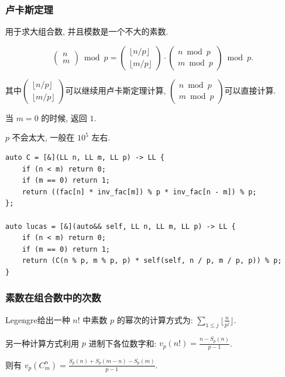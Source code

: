 \documentclass[UTF8, a4paper, titlepage, twoside]{ctexart}
\begin{document}
\subsubsection{ 卢卡斯定理 }
用于求大组合数, 并且模数是一个不大的素数.

$$
\left(\begin{array}{cl}n \\ m\end{array}\right) \bmod p = \left(\begin{array}{cl}{\lfloor n / p\rfloor} \\ {\lfloor m / p\rfloor}\end{array}\right) \cdot\left(\begin{array}{cl}n \bmod p \\ m \bmod p\end{array}\right) \bmod p.
$$

其中$\left(\begin{array}{cl}{\lfloor n / p\rfloor} \\ {\lfloor m / p\rfloor}\end{array}\right)$可以继续用卢卡斯定理计算, $\left(\begin{array}{cl}n \bmod p \\ m \bmod p\end{array}\right)$可以直接计算.

当 $m = 0$ 的时候, 返回 $1$. 

$p$ 不会太大, 一般在 $10^5$ 左右.

\begin{lstlisting}
auto C = [&](LL n, LL m, LL p) -> LL {
    if (n < m) return 0;
    if (m == 0) return 1;
    return ((fac[n] * inv_fac[m]) % p * inv_fac[n - m]) % p;
};

auto lucas = [&](auto&& self, LL n, LL m, LL p) -> LL {
    if (n < m) return 0;
    if (m == 0) return 1;
    return (C(n % p, m % p, p) * self(self, n / p, m / p, p)) % p;
}
\end{lstlisting}

\subsubsection{ 素数在组合数中的次数 }
Legengre给出一种 $n!$ 中素数 $p$ 的幂次的计算方式为: $\sum_{1 \leqslant j} \lfloor \frac{n}{p^j} \rfloor$.

另一种计算方式利用 $p$ 进制下各位数字和: $v_p(n!) = \frac{n - S_p(n)}{p - 1}$.

则有 $v_p(C_m^n) = \frac{S_p(n) + S_p(m - n) - S_p(m)}{p - 1}$.
\end{document}
